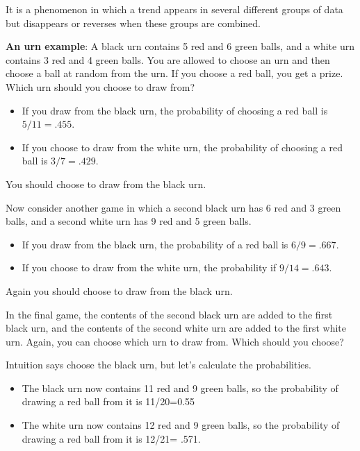 It is a phenomenon in which a trend appears in several different
groups of data but disappears or reverses when these groups are
combined.

\textbf{An urn example}: A black urn contains 5 red and 6 green balls,
and a white urn contains 3 red and 4 green balls. You are allowed to
choose an urn and then choose a ball at random from the urn. If you
choose a red ball, you get a prize. Which urn should you choose to
draw from?

\begin{itemize}
\item If you draw from the black urn, the probability of choosing a
  red ball is $5/11 = .455$.
\item If you choose to draw from the white urn, the probability of
  choosing a red ball is $3/7 = .429$.
\end{itemize}

You should choose to draw from the black urn.

Now consider another game in which a second black urn has 6 red and
3 green balls, and a second white urn has 9 red and 5 green balls.

\begin{itemize}
\item If you draw from the black urn, the probability of a red ball is
  $6/9 = .667$.
\item If you choose to draw from the white urn, the probability if
  $9/14 = .643$.
\end{itemize}

Again you should choose to draw from the black urn.

In the final game, the contents of the second black urn are added to
the first black urn, and the contents of the second white urn are
added to the first white urn. Again, you can choose which urn to draw
from. Which should you choose?

Intuition says choose the black urn, but let's calculate the
probabilities.

\begin{itemize}
\item The black urn now contains 11 red and 9 green balls, so the
  probability of drawing a red ball from it is 11/20=0.55
\item The white urn now contains 12 red and 9 green balls, so the
  probability of drawing a red ball from it is 12/21= .571.
\end{itemize}

